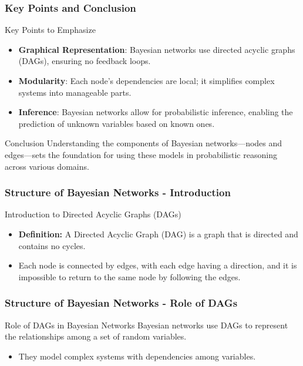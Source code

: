 \documentclass[aspectratio=169]{beamer}
\begin{document}
\begin{frame}[fragile]
    \frametitle{Key Points and Conclusion}
    \begin{block}{Key Points to Emphasize}
        \begin{itemize}
            \item \textbf{Graphical Representation}: Bayesian networks use directed acyclic graphs (DAGs), ensuring no feedback loops.
            \item \textbf{Modularity}: Each node's dependencies are local; it simplifies complex systems into manageable parts.
            \item \textbf{Inference}: Bayesian networks allow for probabilistic inference, enabling the prediction of unknown variables based on known ones.
        \end{itemize}
    \end{block}
    \begin{block}{Conclusion}
        Understanding the components of Bayesian networks—nodes and edges—sets the foundation for using these models in probabilistic reasoning across various domains.
    \end{block}
\end{frame}

\begin{frame}[fragile]
    \frametitle{Structure of Bayesian Networks - Introduction}
    \begin{block}{Introduction to Directed Acyclic Graphs (DAGs)}
        \begin{itemize}
            \item \textbf{Definition:} A Directed Acyclic Graph (DAG) is a graph that is directed and contains no cycles. 
            \item Each node is connected by edges, with each edge having a direction, and it is impossible to return to the same node by following the edges.
        \end{itemize}
    \end{block}
\end{frame}

\begin{frame}[fragile]
    \frametitle{Structure of Bayesian Networks - Role of DAGs}
    \begin{block}{Role of DAGs in Bayesian Networks}
        Bayesian networks use DAGs to represent the relationships among a set of random variables. 
        \begin{itemize}
            \item They model complex systems with dependencies among variables.
        \end{itemize}
    \end{block}
\end{frame}
\end{document}
